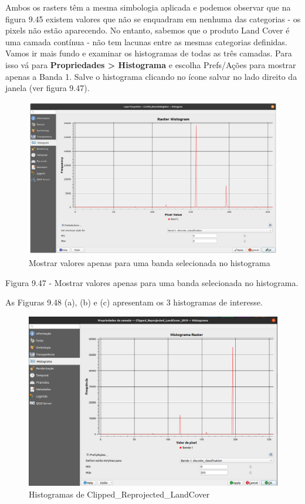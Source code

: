 \documentclass[
]{krantz}
\begin{document}
Ambos os rasters têm a mesma simbologia aplicada e podemos observar que na figura 9.45 existem valores que não se enquadram em nenhuma das categorias - os pixels não estão aparecendo. No entanto, sabemos que o produto Land Cover é uma camada contínua - não tem lacunas entre as mesmas categorias definidas. Vamos ir mais fundo e examinar os histogramas de todas as três camadas. Para isso vá para \textbf{Propriedades \textgreater{} Histograma} e escolha Prefs/Ações para mostrar apenas a Banda 1. Salve o histograma clicando no ícone salvar no lado direito da janela (ver figura 9.47).

\begin{figure}
\centering
\includegraphics{media/modulo9/fig947.png}
\caption{Mostrar valores apenas para uma banda selecionada no histograma}
\end{figure}

Figura 9.47 - Mostrar valores apenas para uma banda selecionada no histograma.

As Figuras 9.48 (a), (b) e (c) apresentam os 3 histogramas de interesse.

\begin{figure}
\centering
\includegraphics{media/modulo9/fig948_a.png}
\caption{Histogramas de Clipped\_Reprojected\_LandCover}
\end{figure}
\end{document}
